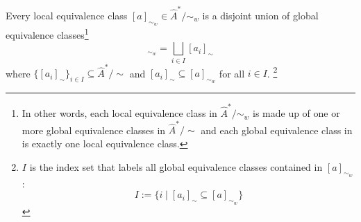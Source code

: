 
\begin{proposition}\label{prp:local_class_is_disjoint_union_of_global_classes}
    Every local equivalence class $[a]_{\sim_{w}} \in \hat{A}^{*}/\sim_{w}$ is a disjoint union of global equivalence classes\footnote{
    In other words, each local equivalence class in $\hat{A}^{*}/\sim_{w}$ is made up of one or more global equivalence classes in $\hat{A}^{*}/\sim$ and each global equivalence class in is exactly one local equivalence class.
    }
    \begin{equation}
        [a]_{\sim_{w}} = \bigsqcup_{i \in I}[a_{i}]_{\sim}
    \end{equation}
    where $\{ [a_{i}]_{\sim} \}_{i \in I} \subseteq \hat{A}^{*}/\sim$ and $[a_{i}]_{\sim} \subseteq [a]_{\sim_{w}}$ for all $i \in I$.
    \footnote{
    $I$ is the index set that labels all global equivalence classes contained in $[a]_{\sim_{w}}$:
    \begin{equation}
        I := \{ i \mid [a_{i}]_{\sim} \subseteq [a]_{\sim_{w}} \}
    \end{equation}
    }
\end{proposition}
